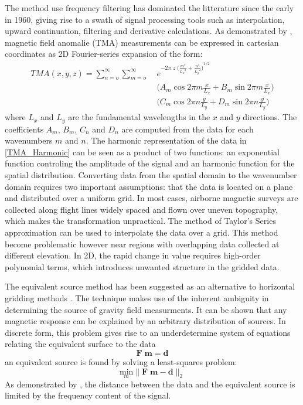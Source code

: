 The method use frequency filtering has dominated the litterature since the early in 1960, giving rise to a swath of signal processing tools such as interpolation, upward continuation, filtering and derivative calculations.  
As demonstrated by \cite{Bhattacharyya64}, magnetic field anomalie (TMA) measurements can be expressed in cartesian coordinates as 2D Fourier-series expansion of the form:
\begin{equation}\label{TMA_Harmonic}
\begin{split}
TMA(x,y,z) = \sum_{n=o}^\infty  \sum_{m=o}^\infty \; & e^{{ -2 \pi \; z \; \Big( \frac{m^2}{{L_x}^2} + \frac{n^2}{{L_y}^2} \Big) }^{1/2}} \\
& \Big(A_m \cos{2\pi m \frac{x}{L_x}} + B_m \sin{2\pi m \frac{x}{L_x}}\Big) \\
& \Big(C_m \cos{2\pi n \frac{y}{L_y}} + D_m \sin{2\pi n \frac{y}{L_y}}\Big)
\end{split}
\end{equation}
where $ L_x$ and $L_y$ are the fundamental wavelengths in the $x$ and $y$ directions. The coefficients $A_m$, $B_m$, $C_n$ and $D_n$ are computed from the data for each wavenumbers $m$ and $n$. The harmonic representation of the data in \eqref{TMA_Harmonic} can be seen as a product of two functions: an exponential function controling the amplitude of the signal and an harmonic function for the spatial distribution. Converting data from the spatial domain to the wavenumber domain requires two important assumptions: that the data is located on a plane and distributed over a uniform grid. In most cases, airborne magnetic surveys are collected along flight lines widely spaced and flown over uneven topography, which makes the transformation unpractical.
The method of Taylor's Series approximation can be used to interpolate the data over a grid. This method become problematic however near regions with overlapping data collected at different elevation. In 2D, the rapid change in value requires high-order polynomial terms, which introduces unwanted structure in the gridded data.
 
The equivalent source method  has been suggested as an alternative to horizontal gridding methods \cite[]{Dampney69}. The technique makes use of the inherent ambiguity in determining the source of gravity field measurments. It can be shown that any magnetic response can be explained by an arbitrary distribution of sources. In discrete form, this problem gives rise to an underdetermine system of equations relating the equivalent surface to the data
\begin{equation}\label{ES_LeastSquare}
	\mathbf{F\;m = d}
\end{equation}
 an equivalent source is found by solving a least-squares problem:
\begin{equation}\label{ES_LeastSquare}
	\underset{m}{\text{min}} \| \mathbf{F\;m - d}\|_2
\end{equation}
As demonstrated by \cite{Dampney69}, the distance between the data and the equivalent source is limited by the frequency content of the signal.

